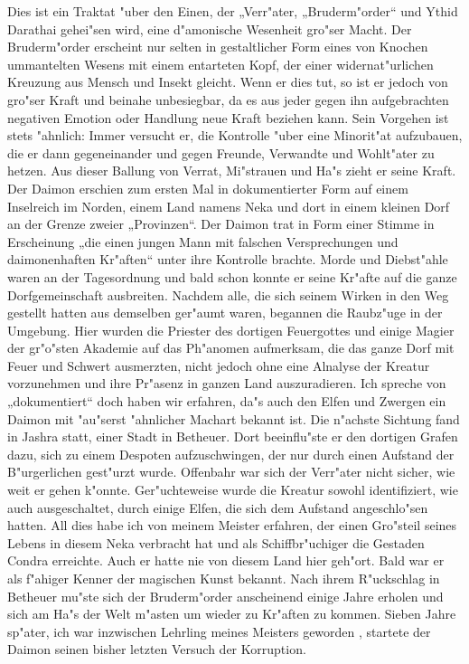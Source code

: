 \documentclass[a5paper,8pt]{book}
\begin{document}
Dies ist ein Traktat "uber den Einen, der „Verr"ater, „Bruderm"order“ und Ythid Darathai gehei"sen wird, eine d"amonische Wesenheit gro"ser Macht.
Der Bruderm"order erscheint nur selten in gestaltlicher Form eines von Knochen ummantelten Wesens mit einem entarteten Kopf, der einer widernat"urlichen Kreuzung aus Mensch und Insekt gleicht. Wenn er dies tut, so ist er jedoch von gro"ser Kraft und beinahe unbesiegbar, da es aus jeder gegen ihn aufgebrachten negativen Emotion oder Handlung neue Kraft beziehen kann.
Sein Vorgehen ist stets "ahnlich: Immer versucht er, die Kontrolle "uber eine Minorit"at aufzubauen, die er dann gegeneinander und gegen Freunde, Verwandte und Wohlt"ater zu hetzen. Aus dieser Ballung von Verrat, Mi"strauen und Ha"s zieht er seine Kraft.
Der Daimon erschien zum ersten Mal in dokumentierter Form auf einem Inselreich im Norden, einem Land namens Neka und dort in einem kleinen Dorf an der Grenze zweier „Provinzen“. Der Daimon trat in Form einer Stimme in Erscheinung „die einen jungen Mann mit falschen Versprechungen und daimonenhaften Kr"aften“ unter ihre Kontrolle brachte. Morde und Diebst"ahle waren an der Tagesordnung und bald schon konnte er seine Kr"afte auf die ganze Dorfgemeinschaft ausbreiten. Nachdem alle, die sich seinem Wirken in den Weg gestellt hatten aus demselben ger"aumt waren, begannen die Raubz"uge in der Umgebung. Hier wurden die Priester des dortigen Feuergottes und einige Magier der gr"o"sten Akademie auf das Ph"anomen aufmerksam, die das ganze Dorf mit Feuer und Schwert ausmerzten, nicht jedoch ohne eine Alnalyse der Kreatur vorzunehmen und ihre Pr"asenz in ganzen Land auszuradieren.
Ich spreche von „dokumentiert“ doch haben wir erfahren, da"s auch den Elfen und Zwergen ein Daimon mit "au"serst "ahnlicher Machart bekannt ist.
Die n"achste Sichtung fand in Jashra statt, einer Stadt in Betheuer. Dort beeinflu"ste er den dortigen Grafen dazu, sich zu einem Despoten aufzuschwingen, der nur durch einen Aufstand der B"urgerlichen gest"urzt wurde. Offenbahr war sich der Verr"ater nicht sicher, wie weit er gehen k"onnte. Ger"uchteweise wurde die Kreatur sowohl identifiziert, wie auch ausgeschaltet, durch einige Elfen, die sich dem Aufstand angeschlo"sen hatten.
All dies habe ich von meinem Meister erfahren, der einen Gro"steil seines Lebens in diesem Neka verbracht hat und als Schiffbr"uchiger die Gestaden Condra erreichte. Auch er hatte nie von diesem Land hier geh"ort. Bald war er als f"ahiger Kenner der magischen Kunst bekannt.
Nach ihrem R"uckschlag in Betheuer mu"ste sich der Bruderm"order anscheinend einige Jahre erholen und sich am Ha"s der Welt m"asten um wieder zu Kr"aften zu kommen. Sieben Jahre sp"ater, ich war inzwischen Lehrling meines Meisters geworden , startete der Daimon seinen bisher letzten Versuch der Korruption.
\end{document}
